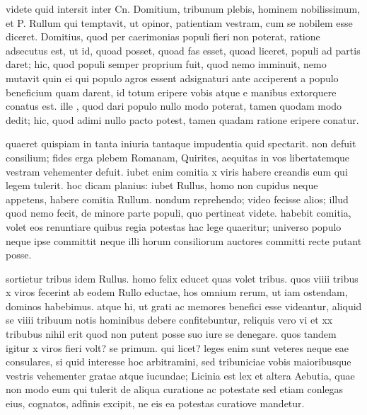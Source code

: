  videte quid intersit inter Cn. Domitium, tribunum plebis, hominem nobilissimum, et P. Rullum qui temptavit, ut opinor, patientiam vestram, cum se nobilem esse diceret. Domitius, quod per caerimonias populi fieri non poterat, ratione adsecutus est, ut id, quoad posset, quoad fas esset, quoad liceret, populi ad partis daret; hic, quod populi semper proprium fuit, quod nemo imminuit, nemo mutavit quin ei qui populo agros essent adsignaturi ante acciperent a populo beneficium quam darent, id totum eripere vobis atque e manibus extorquere conatus est. ille , quod dari populo nullo modo poterat, tamen quodam modo dedit; hic, quod adimi nullo pacto potest, tamen quadam ratione eripere conatur.

 quaeret quispiam in tanta iniuria tantaque impudentia quid spectarit. non defuit consilium; fides erga plebem Romanam, Quirites, aequitas in vos libertatemque vestram vehementer defuit. iubet enim comitia x viris habere creandis eum qui legem tulerit. hoc dicam planius: iubet Rullus, homo non cupidus neque appetens, habere comitia Rullum. nondum reprehendo; video fecisse alios; illud quod nemo fecit, de minore parte populi, quo pertineat videte. habebit comitia, volet eos renuntiare quibus regia potestas hac lege quaeritur; universo populo neque ipse committit neque illi horum consiliorum auctores committi recte putant posse.

 sortietur tribus idem Rullus. homo felix educet quas volet tribus. quos viiii tribus x viros fecerint ab eodem Rullo eductae, hos omnium rerum, ut iam ostendam, dominos habebimus. atque hi, ut grati ac memores benefici esse videantur, aliquid se viiii tribuum notis hominibus debere confitebuntur, reliquis vero vi et xx tribubus nihil erit quod non putent posse suo iure se denegare. quos tandem igitur x viros fieri volt? se primum. qui licet? leges enim sunt veteres neque eae consulares, si quid interesse hoc arbitramini, sed tribuniciae vobis maioribusque vestris vehementer gratae atque iucundae; Licinia est lex et altera Aebutia, quae non modo eum qui tulerit de aliqua curatione ac potestate sed etiam conlegas eius, cognatos, adfinis excipit, ne eis ea potestas curatiove mandetur.

